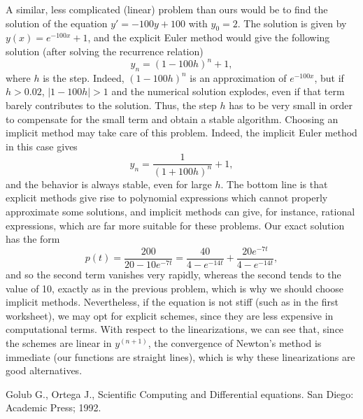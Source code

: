 \documentclass[a4paper,10pt]{article}
\begin{document}
A similar, less complicated (linear) problem than ours would be to find the solution of the equation $y' = -100y + 100$ with $y_0 = 2$. The solution is given by $y(x) = e^{-100x}+1$, and the explicit Euler method would give the following solution (after solving the recurrence relation)
\begin{equation}
y_n = (1-100h)^n+1,
\label{eq:EulAp}
\end{equation}
where $h$ is the step. Indeed, $(1-100h)^n$ is an approximation of $e^{-100x}$, but if $h>0.02$, $|1-100h|>1$ and the numerical solution explodes, even if that term barely contributes to the solution. Thus, the step $h$ has to be very small in order to compensate for the small term and obtain a stable algorithm. Choosing an implicit method may take care of this problem. Indeed, the implicit Euler method in this case gives
\begin{equation}
y_n = \frac{1}{(1+100h)^n}+1,
\label{eq:sol2}
\end{equation}
and the behavior is always stable, even for large $h$. The bottom line is that explicit methods give rise to polynomial expressions which cannot properly approximate some solutions, and implicit methods can give, for instance, rational expressions, which are far more suitable for these problems.
Our exact solution has the form
\begin{equation}
p(t)=\frac{200}{20-10e^{-7t}} = \frac{40}{4-e^{-14t}}+\frac{20e^{-7t}}{4-e^{-14t}},
\label{eq:solEx2}
\end{equation}
and so the second term vanishes very rapidly, whereas the second tends to the value of 10, exactly as in the previous problem, which is why we should choose implicit methods. Nevertheless, if the equation is not stiff (such as in the first worksheet), we may opt for explicit schemes, since they are less expensive in computational terms. With respect to the linearizations, we can see that, since the schemes are linear in $y^{(n+1)}$, the convergence of Newton's method is immediate (our functions are straight lines), which is why these linearizations are good alternatives.

\begin{thebibliography}{99}
	Golub G., Ortega J., Scientific Computing and Differential equations. San Diego: Academic Press; 1992.
\end{thebibliography}
\end{document}

